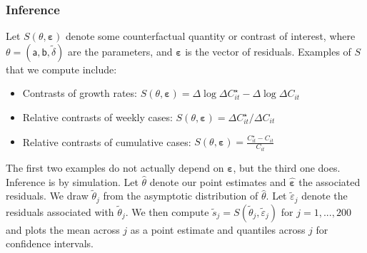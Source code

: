 \documentclass[3p, longtitle]{elsarticle}
\theoremstyle{definition}
\begin{document}

\subsubsection*{Inference}

Let $S(\theta, \mathbf{\varepsilon})$ denote some counterfactual
quantity or contrast of interest, where $\theta = (\mathsf{a},
\mathsf{b}, \tilde{\delta})$ are the parameters, and
$\mathbf{\varepsilon}$ is the vector of residuals. Examples of $S$
that we compute include:

\begin{itemize}
\item Contrasts of growth rates: $S(\theta, \mathbf{\varepsilon}) =
  \Delta \log \Delta C_{it}^\star - \Delta \log \Delta C_{it}$

\item Relative contrasts of weekly cases: $S(\theta, \mathbf{\varepsilon}) =
  \Delta C_{it}^\star/\Delta C_{it}$

\item Relative contrasts of cumulative cases: $S(\theta, \mathbf{\varepsilon}) =
  \frac{C_{it}^\star - C_{it}}{C_{it}}$
\end{itemize}

The first two examples do not actually depend on
$\mathbf{\varepsilon}$, but the third one does. Inference is by
simulation. Let $\hat{\theta}$ denote our point estimates and
$\hat{\mathbf{\varepsilon}}$ the associated residuals. We draw
$\tilde{\theta}_j$ from the asymptotic distribution of
$\hat{\theta}$. Let $\tilde{\varepsilon}_j$ denote the
residuals associated with $\tilde{\theta}_j$. We then compute
$ \tilde{s}_j = S(\tilde{\theta}_j, \tilde{\varepsilon}_j) $
for $j=1,..., 200$ and plots the mean across $j$ as a point estimate
and quantiles across $j$ for confidence intervals.
\end{document}
